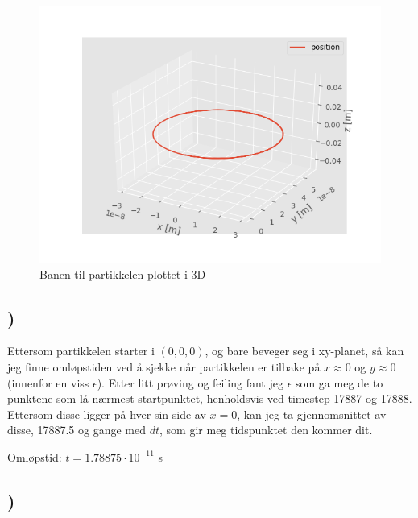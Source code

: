 \documentclass[report,12pt,norsk]{article}
\begin{document}
 \begin{figure}[h!]
        \centering 
        \includegraphics[scale=0.7]{position_plot_3d.png}
        \caption{Banen til partikkelen plottet i 3D}
\end{figure}

\subsection{)} 
Ettersom partikkelen starter i $(0, 0, 0)$, og bare beveger seg i xy-planet, så kan jeg finne omløpstiden ved å sjekke når partikkelen er tilbake på $x\approx0$ og $y\approx0$(innenfor en viss $\epsilon$).
Etter litt prøving og feiling fant jeg $\epsilon$ som ga meg de to punktene som lå nærmest startpunktet, henholdsvis ved timestep 17887 og 17888. Ettersom disse ligger på hver sin side av $x=0$, kan jeg ta gjennomsnittet av disse, 17887.5 og gange med $dt$, som gir meg tidspunktet den kommer dit. 

Omløpstid: $t=1.78875 \cdot 10^{-11}$ s

\subsection{)}
\end{document}
